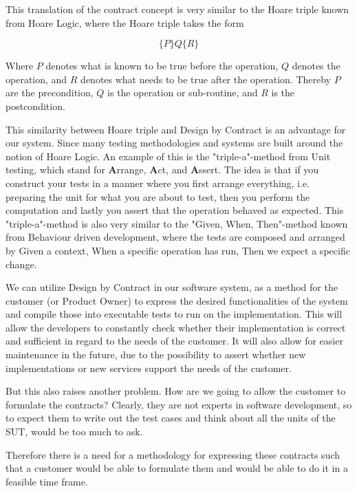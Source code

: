 This translation of the contract concept is very similar to the Hoare triple known from Hoare Logic, where the Hoare triple takes the form

\begin{equation}
\{P\} Q \{R\}
\end{equation}

Where $P$ denotes what is known to be true before the operation, $Q$ denotes the operation, and $R$ denotes what needs to be true after the operation. Thereby $P$ are the precondition, $Q$ is the operation or sub-routine, and $R$ is the postcondition. 

This similarity between Hoare triple and Design by Contract is an advantage for our system. Since many testing methodologies and systems are built around the notion of Hoare Logic. 
An example of this is the "triple-a"-method from Unit testing, which stand for \textbf{A}rrange, \textbf{A}ct, and \textbf{A}ssert.
The idea is that if you construct your tests in a manner where you first arrange everything, i.e. preparing the unit for what you are about to test, then you perform the computation and lastly you assert that the operation behaved as expected. 
This "triple-a"-method is also very similar to the "Given, When, Then"-method known from Behaviour driven development, where the tests are composed and arranged by Given a context, When a specific operation has run, Then we expect a specific change. 

We can utilize Design by Contract in our software system, as a method for the customer (or Product Owner) to express the desired functionalities of the system and compile those into executable tests to run on the implementation. 
This will allow the developers to constantly check whether their implementation is correct and sufficient in regard to the needs of the customer. 
It will also allow for easier maintenance in the future, due to the possibility to assert whether new implementations or new services support the needs of the customer.

But this also raises another problem. 
How are we going to allow the customer to formulate the contracts? 
Clearly, they are not experts in software development, so to expect them to write out the test cases and think about all the units of the SUT, would be too much to ask.

Therefore there is a need for a methodology for expressing these contracts such that a customer would be able to formulate them and would be able to do it in a feasible time frame.
